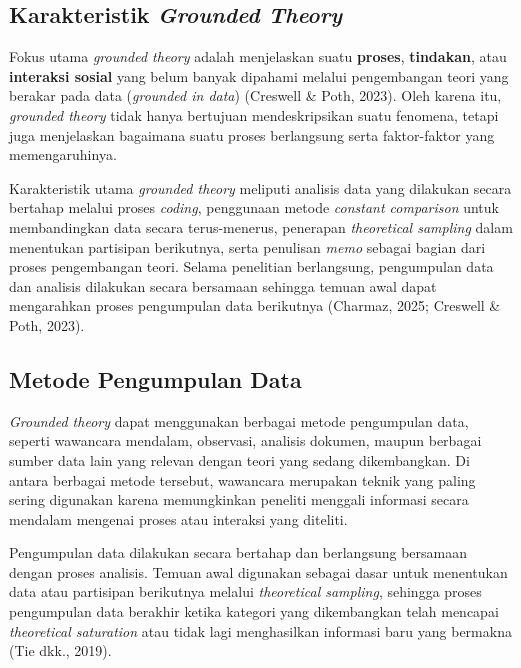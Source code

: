 \documentclass[
  indonesian,
  letterpaper,
  DIV=11,
  numbers=noendperiod]{scrreprt}
\begin{document}
\subsection{\texorpdfstring{Karakteristik \emph{Grounded
Theory}}{Karakteristik Grounded Theory}}\label{karakteristik-grounded-theory}

Fokus utama \emph{grounded theory} adalah menjelaskan suatu
\textbf{proses}, \textbf{tindakan}, atau \textbf{interaksi sosial} yang
belum banyak dipahami melalui pengembangan teori yang berakar pada data
(\emph{grounded in data}) (Creswell \& Poth, 2023). Oleh karena itu,
\emph{grounded theory} tidak hanya bertujuan mendeskripsikan suatu
fenomena, tetapi juga menjelaskan bagaimana suatu proses berlangsung
serta faktor-faktor yang memengaruhinya.

Karakteristik utama \emph{grounded theory} meliputi analisis data yang
dilakukan secara bertahap melalui proses \emph{coding}, penggunaan
metode \emph{constant comparison} untuk membandingkan data secara
terus-menerus, penerapan \emph{theoretical sampling} dalam menentukan
partisipan berikutnya, serta penulisan \emph{memo} sebagai bagian dari
proses pengembangan teori. Selama penelitian berlangsung, pengumpulan
data dan analisis dilakukan secara bersamaan sehingga temuan awal dapat
mengarahkan proses pengumpulan data berikutnya (Charmaz, 2025; Creswell
\& Poth, 2023).

\subsection{Metode Pengumpulan Data}\label{metode-pengumpulan-data-6}

\emph{Grounded theory} dapat menggunakan berbagai metode pengumpulan
data, seperti wawancara mendalam, observasi, analisis dokumen, maupun
berbagai sumber data lain yang relevan dengan teori yang sedang
dikembangkan. Di antara berbagai metode tersebut, wawancara merupakan
teknik yang paling sering digunakan karena memungkinkan peneliti
menggali informasi secara mendalam mengenai proses atau interaksi yang
diteliti.

Pengumpulan data dilakukan secara bertahap dan berlangsung bersamaan
dengan proses analisis. Temuan awal digunakan sebagai dasar untuk
menentukan data atau partisipan berikutnya melalui \emph{theoretical
sampling}, sehingga proses pengumpulan data berakhir ketika kategori
yang dikembangkan telah mencapai \emph{theoretical saturation} atau
tidak lagi menghasilkan informasi baru yang bermakna (Tie dkk., 2019).
\end{document}
